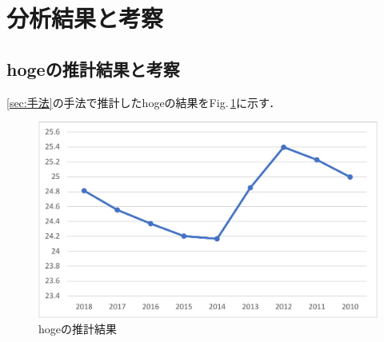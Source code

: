 \documentclass[a4paper,xelatex,ja=standard,hiresbb,12pt]{bxjsarticle}
\begin{document}
    \section{分析結果と考察\label{sec:結果と考察}}
    \subsection{hogeの推計結果と考察}
    \ref{sec:手法}の手法で推計したhogeの結果をFig.\,\ref{fig:hoge推計結果}に示す．
        

    
    \begin{figure}[p]
        \centering
        \includegraphics[scale = 0.7]{Figures/Hoge-crop.pdf}
        \caption{hogeの推計結果 \label{fig:hoge推計結果}}
    \end{figure}

\end{document}
